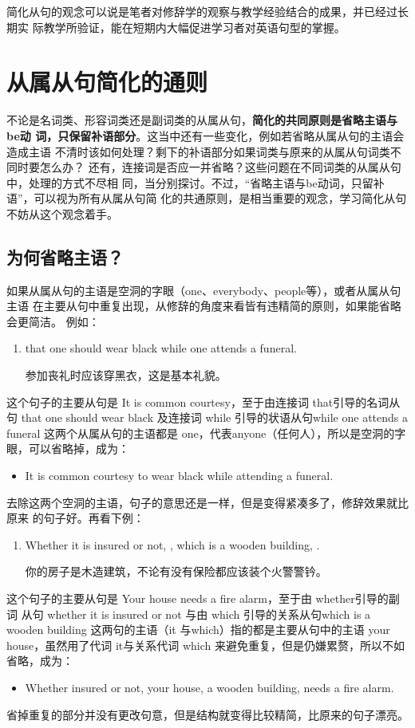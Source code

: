 简化从句的观念可以说是笔者对修辞学的观察与教学经验结合的成果，并已经过长期实
际教学所验证，能在短期内大幅促进学习者对英语句型的掌握。

\section{从属从句简化的通则}

不论是名词类、形容词类还是副词类的从属从句，\textbf{简化的共同原则是省略主语与be动
  词，只保留补语部分}。这当中还有一些变化，例如若省略从属从句的主语会造成主语
不清时该如何处理？剩下的补语部分如果词类与原来的从属从句词类不同时要怎么办？
还有，连接词是否应一并省略？这些问题在不同词类的从属从句中，处理的方式不尽相
同，当分别探讨。不过，“省略主语与be动词，只留补语”，可以视为所有从属从句简
化的共通原则，是相当重要的观念，学习简化从句不妨从这个观念着手。

\subsection{为何省略主语？}

如果从属从句的主语是空洞的字眼（one、everybody、people等），或者从属从句主语
在主要从句中重复出现，从修辞的角度来看皆有违精简的原则，如果能省略会更简洁。
例如：

\begin{enumerate}
\item {}   that one should wear
  black while one attends a funeral.

  参加丧礼时应该穿黑衣，这是基本礼貌。
\end{enumerate}
这个句子的主要从句是 It is common courtesy，至于由连接词 that引导的名词从
句 that one should wear black 及连接词 while 引导的状语从句while one attends
a funeral 这两个从属从句的主语都是 one，代表anyone（任何人），所以是空洞的字
眼，可以省略掉，成为：
\begin{itemize}
\item It is common courtesy to wear black while attending a funeral.
\end{itemize}
去除这两个空洞的主语，句子的意思还是一样，但是变得紧凑多了，修辞效果就比原来
的句子好。再看下例：
\begin{enumerate}[resume]
\item Whether it is insured or not, , which is a wooden
  building,  .

  你的房子是木造建筑，不论有没有保险都应该装个火警警钤。
\end{enumerate}
这个句子的主要从句是 Your house needs a fire alarm，至于由 whether引导的副词
从句 whether it is insured or not 与由 which 引导的关系从句which is a
wooden building 这两句的主语（it 与which）指的都是主要从句中的主语 your
house，虽然用了代词 it与关系代词 which 来避免重复，但是仍嫌累赘，所以不如
省略，成为：
\begin{itemize}
\item Whether insured or not, your house, a wooden building, needs a fire
  alarm.
\end{itemize}
省掉重复的部分并没有更改句意，但是结构就变得比较精简，比原来的句子漂亮。

